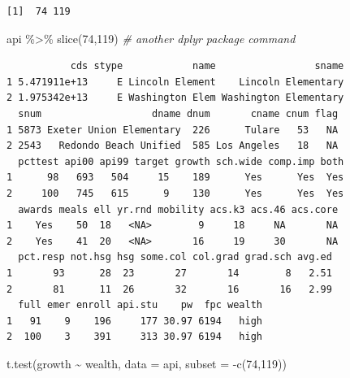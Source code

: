 \documentclass[
]{book}
\newenvironment{Shaded}{\begin{snugshade}}{\end{snugshade}}
\newcommand{\AttributeTok}[1]{\textcolor[rgb]{0.77,0.63,0.00}{#1}}
\newcommand{\CommentTok}[1]{\textcolor[rgb]{0.56,0.35,0.01}{\textit{#1}}}
\newcommand{\DecValTok}[1]{\textcolor[rgb]{0.00,0.00,0.81}{#1}}
\newcommand{\FunctionTok}[1]{\textcolor[rgb]{0.00,0.00,0.00}{#1}}
\newcommand{\NormalTok}[1]{#1}
\newcommand{\SpecialCharTok}[1]{\textcolor[rgb]{0.00,0.00,0.00}{#1}}
\begin{document}
\begin{Shaded}
\end{Shaded}

\begin{verbatim}
[1]  74 119
\end{verbatim}

\begin{Shaded}
\begin{Highlighting}[]
\NormalTok{api }\SpecialCharTok{\%\textgreater{}\%} \FunctionTok{slice}\NormalTok{(}\DecValTok{74}\NormalTok{,}\DecValTok{119}\NormalTok{)  }\CommentTok{\# another dplyr package command}
\end{Highlighting}
\end{Shaded}

\begin{verbatim}
           cds stype            name                 sname
1 5.471911e+13     E Lincoln Element    Lincoln Elementary
2 1.975342e+13     E Washington Elem Washington Elementary
  snum                   dname dnum       cname cnum flag
1 5873 Exeter Union Elementary  226      Tulare   53   NA
2 2543   Redondo Beach Unified  585 Los Angeles   18   NA
  pcttest api00 api99 target growth sch.wide comp.imp both
1      98   693   504     15    189      Yes      Yes  Yes
2     100   745   615      9    130      Yes      Yes  Yes
  awards meals ell yr.rnd mobility acs.k3 acs.46 acs.core
1    Yes    50  18   <NA>        9     18     NA       NA
2    Yes    41  20   <NA>       16     19     30       NA
  pct.resp not.hsg hsg some.col col.grad grad.sch avg.ed
1       93      28  23       27       14        8   2.51
2       81      11  26       32       16       16   2.99
  full emer enroll api.stu    pw  fpc wealth
1   91    9    196     177 30.97 6194   high
2  100    3    391     313 30.97 6194   high
\end{verbatim}

\begin{Shaded}
\begin{Highlighting}[]
\FunctionTok{t.test}\NormalTok{(growth }\SpecialCharTok{\textasciitilde{}}\NormalTok{ wealth, }\AttributeTok{data =}\NormalTok{ api, }\AttributeTok{subset =} \SpecialCharTok{{-}}\FunctionTok{c}\NormalTok{(}\DecValTok{74}\NormalTok{,}\DecValTok{119}\NormalTok{))}
\end{Highlighting}
\end{Shaded}
\end{document}
